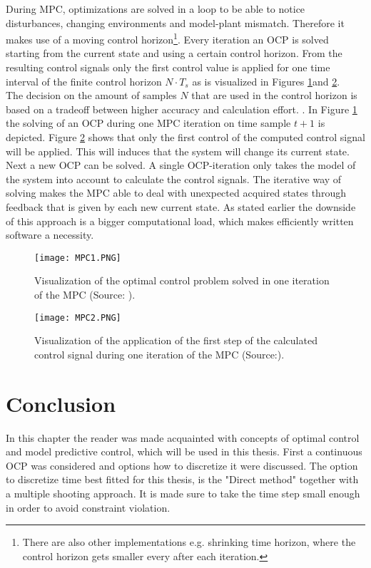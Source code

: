 During MPC, optimizations are solved in a loop to be able to notice disturbances, changing environments and model-plant mismatch. Therefore it makes use of a moving control horizon\footnote{There are also other implementations e.g. shrinking time horizon, where the control horizon gets smaller every after each iteration.}. Every iteration an OCP is solved starting from the current state and using a certain control horizon.  From the resulting control signals only the first control value is applied for one time interval of the finite control horizon $N\cdot T_{s}$ as is visualized in Figures \ref{fig:MPC1}and \ref{fig:MPC2}.\\
The decision on the amount of samples $N$ that are used in the control horizon is based on a tradeoff between higher accuracy and calculation effort. \cite{TongDuySon2019, Mercy2018}. In Figure \ref{fig:MPC1} the solving of an OCP during one MPC iteration on time sample $t+1$ is depicted. Figure \ref{fig:MPC2} shows that only the first control of the computed control signal will be applied.  This will induces that the system will change its current state. Next a new OCP can be solved. A single OCP-iteration only takes the model of the system into account to calculate the control signals. The iterative way of solving makes the MPC able to deal with unexpected acquired states through feedback that is given by each new current state. As stated earlier the downside of this approach is a bigger computational load, which makes efficiently written software a necessity.  \cite{Patrinos2019}\\

\begin{figure}[h!]
	\centering
	\texttt{[image: MPC1.PNG]}
	\caption{Visualization of the optimal control problem solved in one iteration of the MPC (Source: \cite{Patrinos2019}).}
	\label{fig:MPC1}
\end{figure}

\begin{figure}[h!]
	\centering
	\texttt{[image: MPC2.PNG]}
	\caption{Visualization of the application of the first step of the calculated control signal during one iteration of the MPC (Source:\cite{Patrinos2019}).}
	\label{fig:MPC2}
\end{figure}


\section{Conclusion}
In this chapter the reader was made acquainted with concepts of optimal control and model predictive control, which will be used in this thesis. 
First a continuous OCP was considered and options how to discretize it were discussed. The option to discretize time best fitted for this thesis, is the "Direct method" together with a multiple shooting approach. It is made sure to take the time step small enough in order to avoid constraint violation. 



